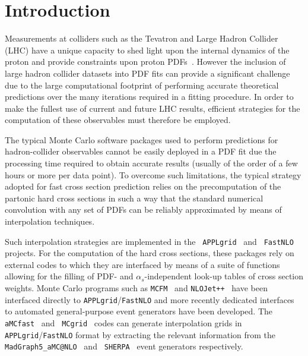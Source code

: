 \documentclass[preprint,12pt]{elsarticle}
\begin{document}
\clearpage


\section{Introduction}\label{sec:intro}

Measurements at colliders such as the Tevatron and Large Hadron Collider (LHC) have a unique capacity to shed light upon the internal dynamics 
of the proton and provide constraints upon proton PDFs~\cite{Rojo:2015acz}. However the inclusion of large hadron collider datasets 
into PDF fits can provide a significant challenge due to the large computational footprint of performing accurate
theoretical predictions over the many iterations required in a fitting procedure. In order to make the fullest use of current 
and future LHC results, efficient strategies for the computation of these observables must therefore be employed. 

The typical Monte Carlo software packages used to perform predictions for 
hadron-collider observables cannot be easily deployed in a PDF fit due the processing time 
required to obtain accurate results (usually of the order of a few hours or more per data
point). To overcome such limitations, the typical strategy
adopted for fast cross section prediction relies on the precomputation
of the partonic hard cross sections in such a way that the standard numerical
convolution with any set of PDFs can be reliably approximated by means of
interpolation techniques.

Such interpolation strategies are implemented in the {\tt
  APPLgrid}~\cite{Carli:2010rw} and {\tt
  FastNLO}~\cite{Wobisch:2011ij} projects. For the computation of the
hard cross sections, these packages rely on external codes to which
they are interfaced by means of a suite of functions allowing for the
filling of PDF- and $\alpha_s$-independent look-up tables of
cross section weights. Monte Carlo programs such as {\tt MCFM}~\cite{Campbell:2010ff}
and {\tt NLOJet++}~\cite{Nagy:2003tz} have been interfaced directly to
{\tt APPLgrid}/{\tt FastNLO} and more recently de\-di\-ca\-ted
interfaces to automated general-purpose event
generators have been developed. The {\tt
  aMCfast}~\cite{Bertone:2014zva} and {\tt
  MCgrid}~\cite{DelDebbio:2013kxa} codes can generate interpolation grids in {\tt APPLgrid}/{\tt FastNLO} format 
 by extracting the relevant information from the {\tt
  MadGraph5\_aMC@NLO}~\cite{Alwall:2014hca} and {\tt
  SHERPA}~\cite{Gleisberg:2008ta} event generators respectively.
\end{document}
